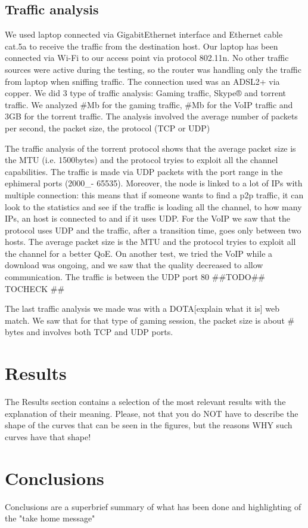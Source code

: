 \documentclass[conference,10pt]{IEEEtran}
\begin{document}
\subsection{Traffic analysis}
We used laptop connected via
GigabitEthernet interface and Ethernet cable cat.5a to receive the traffic from the destination host.
Our laptop has been connected via Wi-Fi to our access point via protocol 802.11n.
No other traffic sources were active during the testing, so the router was handling only
the traffic from laptop when sniffing traffic. The connection used was an ADSL2+ via copper.
We did 3 type of traffic analysis: Gaming traffic, Skype® and torrent traffic. We analyzed
#Mb for the gaming traffic, #Mb for the VoIP traffic and 3GB for the torrent traffic.
The analysis involved the average number of packets per second, the packet size, the protocol (TCP or UDP)

The traffic analysis of the torrent protocol shows that the average packet size is the MTU
(i.e. 1500bytes) and the protocol tryies to exploit all the channel capabilities. The traffic
is made via UDP packets with the port range in the ephimeral ports (2000_- 65535).
Moreover, the node is linked to a lot of IPs with multiple connection: this means that
if someone wants to find a p2p traffic, it can look to the statistics and see if the traffic is loading all the channel,
to how many IPs, an host is connected to and if it uses UDP.
For the VoIP we saw that the protocol uses UDP and the traffic, after a transition time, goes only between two hosts.
The average packet size is the MTU and the protocol tryies to exploit all the channel for a better QoE.
On another test, we tried the VoIP while a download was ongoing, and we saw that the quality
decreased to allow communication. The traffic is between the UDP port 80 ##TODO## TOCHECK ##

The last traffic analysis we made was with a DOTA[explain what it is] web match.
We saw that for that type of gaming session, the packet size is about # bytes and involves both TCP and UDP ports.


\section{Results}\label{sec:res}
The Results section contains a selection of the most relevant results with the explanation of their meaning. Please, not that you do NOT have to describe the shape of the curves that can be seen in the figures, but the reasons WHY such curves have that shape!

\section{Conclusions}\label{sec:conclusion}
Conclusions are a superbrief summary of what has been done and highlighting of the "take home message"
\end{document}
